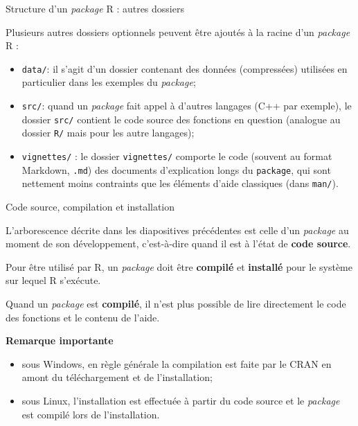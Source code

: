 \documentclass[12pt,handout,ignorenonframetext,]{beamer}
\providecommand{\tightlist}{%
  \setlength{\itemsep}{0pt}\setlength{\parskip}{0pt}}
\newcommand{\intertitre}[1]{\textbf{\textcolor{redInsee}{#1}}}
\begin{document}
\begin{frame}[fragile]{Structure d'un \emph{package} R : autres
dossiers}

Plusieurs autres dossiers optionnels peuvent être ajoutés à la racine
d'un \emph{package} R :

\begin{itemize}
\tightlist
\item
  \pause \texttt{data/}: il s'agit d'un dossier contenant des données
  (compressées) utilisées en particulier dans les exemples du
  \emph{package};
\item
  \pause \texttt{src/}: quand un \emph{package} fait appel à d'autres
  langages (C++ par exemple), le dossier \texttt{src/} contient le code
  source des fonctions en question (analogue au dossier \texttt{R/} mais
  pour les autre langages);
\item
  \pause \texttt{vignettes/} : le dossier \texttt{vignettes/} comporte
  le code (souvent au format Markdown, \texttt{.md}) des documents
  d'explication longs du \texttt{package}, qui sont nettement moins
  contraints que les éléments d'aide classiques (dans \texttt{man/}).
\end{itemize}

\end{frame}

\begin{frame}{Code source, compilation et installation}

L'arborescence décrite dans les diapositives précédentes est celle d'un
\emph{package} au moment de son développement, c'est-à-dire quand il est
à l'état de \textbf{code source}.

\pause \bigskip Pour être utilisé par R, un \emph{package} doit être
\textbf{compilé} et \textbf{installé} pour le système sur lequel R
s'exécute.

\pause \bigskip Quand un \emph{package} est \textbf{compilé}, il n'est
plus possible de lire directement le code des fonctions et le contenu de
l'aide.

\pause \bigskip \intertitre{Remarque importante}

\begin{itemize}
\tightlist
\item
  \pause sous Windows, en règle générale la compilation est faite par le
  CRAN en amont du téléchargement et de l'installation;
\item
  \pause sous Linux, l'installation est effectuée à partir du code
  source et le \emph{package} est compilé lors de l'installation.
\end{itemize}

\end{frame}
\end{document}
